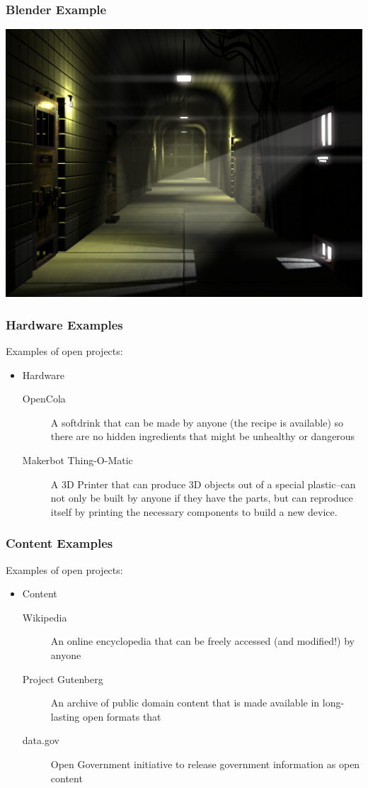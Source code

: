 \documentclass{beamer}
\begin{document}
\begin{frame}
  \frametitle{Blender Example}
    \includegraphics[width=\textwidth]{img/blendermine}
\end{frame}

\begin{frame}
  \frametitle{Hardware Examples}
  Examples of open projects:

  \begin{itemize}
  \item Hardware
    \begin{description}
    \item[OpenCola] A softdrink that can be made by anyone (the recipe
      is available) so there are no hidden ingredients that might be
      unhealthy or dangerous
    \item[Makerbot Thing-O-Matic] A \textcolor{beamer@myblue}{3D}
      Printer that can produce 3D objects out of a special
      plastic--can not only be built by anyone if they have the parts,
      but can \textcolor{beamer@myblue}{reproduce} itself by printing
      the necessary components to build a new device.
    \end{description}
  \end{itemize}
\end{frame}

\begin{frame}
  \frametitle{Content Examples}
  Examples of open projects:
  \begin{itemize}
  \item Content
    \begin{description}
    \item[Wikipedia] An online encyclopedia that can be freely accessed (and modified!) by anyone
    \item[Project Gutenberg] An archive of public domain content that is made available in long-lasting open formats that
    \item[data.gov] Open Government initiative to release government information as open content
    \end{description}
  \end{itemize}
\end{frame}
\end{document}
